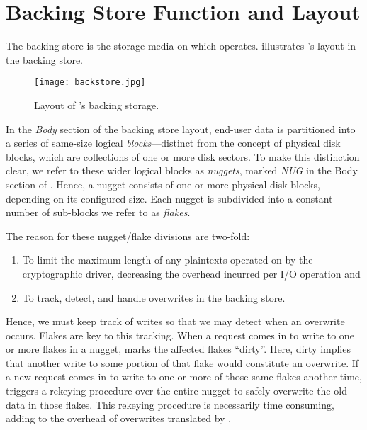 \section{Backing Store Function and Layout}

The backing store is the storage media on which \SYSTEM{} operates.
 illustrates \SYSTEM{}'s layout in the backing
store.

\begin{figure}[ht]
 \centering
  \texttt{[image: backstore.jpg]}
   \caption{Layout of \SYSTEM{}'s backing storage.}
    \label{fig:backstore}
\end{figure}

In the \textit{Body} section of the backing store layout, end-user
data is partitioned into a series of same-size logical
\emph{blocks}---distinct from the concept of physical disk blocks,
which are collections of one or more disk sectors. To make this
distinction clear, we refer to these wider logical blocks as
\emph{nuggets}, marked \textit{NUG} in the Body section of
. Hence, a nugget consists of one or more physical
disk blocks, depending on its configured size. Each nugget is
subdivided into a constant number of sub-blocks we refer to as
\emph{flakes}. 

The reason for these nugget/flake divisions are two-fold:
\begin{enumerate}
\item To limit the maximum length of any plaintexts operated on by the
  cryptographic driver, decreasing the overhead incurred per I/O
  operation and
\item To track, detect, and handle overwrites in the backing store.
\end{enumerate}

Hence, we must keep track of writes so that we may detect when an
overwrite occurs. Flakes are key to this tracking. When a request
comes in to write to one or more flakes in a nugget, \SYSTEM{} marks
the affected flakes ``dirty''. Here, dirty implies that another write
to some portion of that flake would constitute an overwrite. If a new
request comes in to write to one or more of those same flakes another
time, \SYSTEM{} triggers a rekeying procedure over the entire nugget
to safely overwrite the old data in those flakes. This rekeying
procedure is necessarily time consuming, adding to the overhead of
overwrites translated by \SYSTEM{}.

